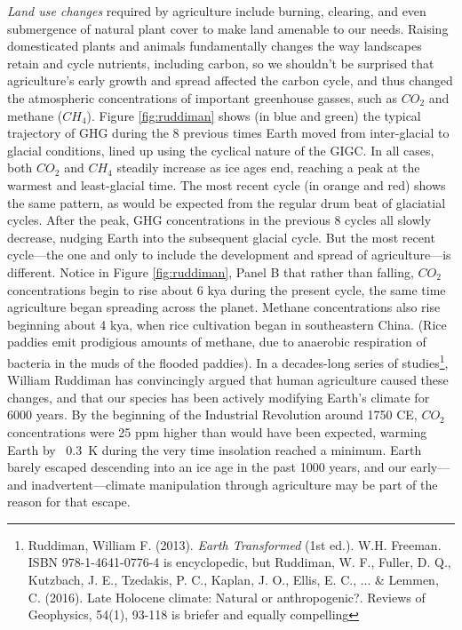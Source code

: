\documentclass[amstex,12pt]{book}
\begin{document}
\emph{Land use changes} required by agriculture include burning, clearing, and even submergence of natural plant cover to make land amenable to our needs. Raising domesticated plants and animals fundamentally changes the way landscapes retain and cycle nutrients, including carbon, so we shouldn't be surprised that agriculture's early growth and spread affected the carbon cycle, and thus changed the atmospheric concentrations of important greenhouse gasses, such as $CO_2$ and methane ($CH_4$). Figure \ref{fig:ruddiman} shows (in blue and green) the typical trajectory of GHG during the 8 previous times Earth moved from inter-glacial to glacial conditions, lined up using the cyclical nature of the GIGC. In all cases, both $CO_2$ and $CH_4$ steadily increase as ice ages end, reaching a peak at the warmest and least-glacial time. The most recent cycle (in orange and red) shows the same pattern, as would be expected from the regular drum beat of glaciatial cycles. After the peak, GHG concentrations in the previous 8 cycles all slowly decrease, nudging Earth into the subsequent glacial cycle. But the most recent cycle---the one and only to include the development and spread of agriculture---is different. Notice in Figure \ref{fig:ruddiman}, Panel B that rather than falling, $CO_2$ concentrations begin to rise about 6 kya during the present cycle, the same time agriculture began spreading across the planet. Methane concentrations also rise beginning about 4 kya, when rice cultivation began in southeastern China. (Rice paddies emit prodigious amounts of methane, due to anaerobic respiration of bacteria in the muds of the flooded paddies). In a decades-long series of studies\footnote{Ruddiman, William F. (2013). \textit{Earth Transformed} (1st ed.). W.H. Freeman. ISBN 978-1-4641-0776-4 is encyclopedic, but Ruddiman, W. F., Fuller, D. Q., Kutzbach, J. E., Tzedakis, P. C., Kaplan, J. O., Ellis, E. C., ... \& Lemmen, C. (2016). Late Holocene climate: Natural or anthropogenic?. Reviews of Geophysics, 54(1), 93-118 is briefer and equally compelling}, William Ruddiman has convincingly argued that human agriculture caused these changes, and that our species has been actively modifying Earth's climate for 6000 years. By the beginning of the Industrial Revolution around 1750 CE, $CO_2$ concentrations were 25 ppm higher than would have been expected, warming Earth by ~\SI{0.3}{\kelvin} during the very time insolation reached a minimum. Earth barely escaped descending into an ice age in the past 1000 years, and our early---and inadvertent---climate manipulation through agriculture may be part of the reason for that escape. \\
    
\end{document}
